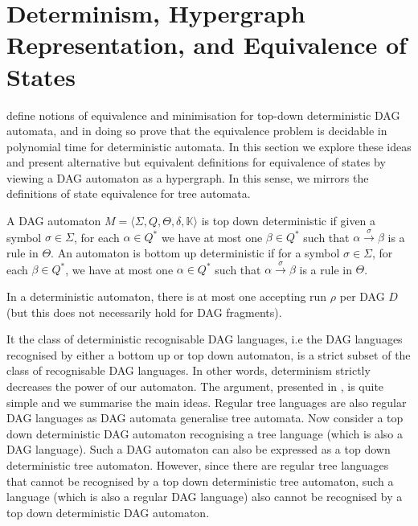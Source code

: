 \documentclass[11pt]{article}
\begin{document}
\section{Determinism, Hypergraph Representation, and Equivalence of States}

\cite{blum2019properties} define notions of equivalence and minimisation for
top-down deterministic DAG automata, and in doing so prove that the equivalence
problem is decidable in polynomial time for deterministic automata. In this
section we explore these ideas and present alternative but equivalent
definitions for equivalence of states by viewing a DAG automaton as a
hypergraph. In this sense, we mirrors the definitions of state equivalence for
tree automata. 

\begin{definition}\label{def:deterministicautomaton} A
  DAG automaton $M =  \langle \Sigma, Q, \Theta, \delta, \mathbb{K}\rangle$ is
  top down deterministic if given a symbol $\sigma \in \Sigma$, for each $\alpha
  \in Q^*$ we have at most one $\beta \in Q^*$ such that $ \alpha
  \xrightarrow{\sigma} \beta$ is a rule in $\Theta$. An automaton is bottom up
  deterministic if for a symbol $\sigma \in \Sigma$, for each $\beta \in Q^*$,
  we have at most one $\alpha \in Q^*$ such that $\alpha \xrightarrow{\sigma}
  \beta$ is a rule in $\Theta$.

\end{definition}

In a deterministic automaton, there is at most one accepting run $\rho$ per DAG
$D$ (but this does not necessarily hold for DAG fragments).

It the class of deterministic recognisable DAG languages, i.e the DAG languages
recognised by either a bottom up or top down automaton, is a strict subset of
the class of recognisable DAG languages. In other words, determinism strictly
decreases the power of our automaton. The argument, presented in
\cite{blum2019properties}, is quite simple and we summarise the main ideas.
Regular tree languages are also regular DAG languages as DAG automata generalise
tree automata. Now consider a top down deterministic DAG automaton recognising a
tree language (which is also a DAG language). Such a DAG automaton can also be
expressed as a top down deterministic tree automaton. However, since there are
regular tree languages that cannot be recognised by a top down deterministic
tree automaton, such a language (which is also a regular DAG language) also
cannot be recognised by a top down deterministic DAG automaton.   
\end{document}
